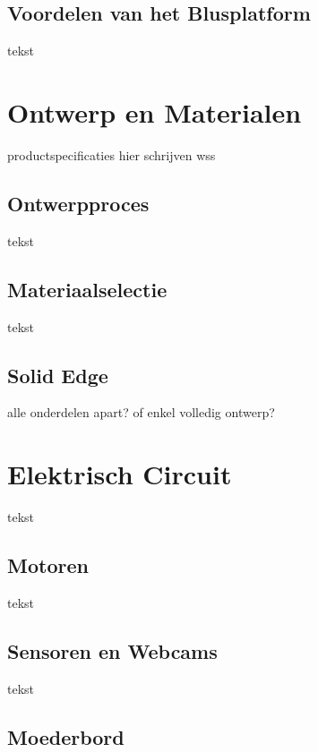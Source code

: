 \documentclass[kulak]{kulakarticle} %
\begin{document}
	
	\subsection{Voordelen van het Blusplatform}
	
	tekst
	
	
	
	\section{Ontwerp en Materialen}
	
	productspecificaties hier schrijven wss
	
	
	\subsection{Ontwerpproces}
	
	tekst
	
	
	\subsection{Materiaalselectie}
	
	tekst
	
	
	\subsection{Solid Edge}
	
	alle onderdelen apart? of enkel volledig ontwerp?
	
	
	
	\section{Elektrisch Circuit}
	
	tekst
	
	
	\subsection{Motoren}
	
	tekst
	
	
	\subsection{Sensoren en Webcams}
	
	tekst
	
	
	\subsection{Moederbord}
	
\end{document}
